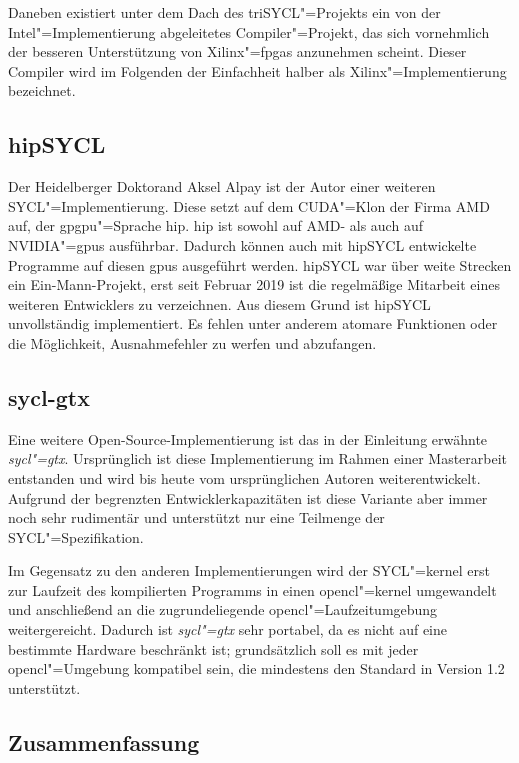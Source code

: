 Daneben existiert unter dem Dach des triSYCL"=Projekts ein von der
Intel"=Implementierung abgeleitetes Compiler"=Projekt, das sich vornehmlich der
besseren Unterstützung von Xilinx"=\gls{fpga}s anzunehmen scheint. Dieser
Compiler wird im Folgenden der Einfachheit halber als Xilinx"=Implementierung
bezeichnet. \cite[vgl.][]{trisyclclang}

\subsection{hipSYCL}

Der Heidelberger Doktorand Aksel Alpay ist der Autor einer weiteren
SYCL"=Implementierung. Diese setzt auf dem CUDA"=Klon der Firma AMD auf, der
\gls{gpgpu}"=Sprache \gls{hip}. \gls{hip} ist sowohl auf AMD- als auch auf
NVIDIA"=\gls{gpu}s ausführbar. Dadurch können auch mit hipSYCL entwickelte
Programme auf diesen \gls{gpu}s ausgeführt werden. hipSYCL war über weite
Strecken ein Ein-Mann-Projekt, erst seit Februar 2019 ist die regelmäßige
Mitarbeit eines weiteren Entwicklers zu verzeichnen. Aus diesem Grund ist
hipSYCL unvollständig implementiert. Es fehlen unter anderem atomare Funktionen
oder die Möglichkeit, Ausnahmefehler zu werfen und abzufangen.
\cite[vgl.][]{hipsycl}

\subsection{sycl-gtx}

Eine weitere Open-Source-Implementierung ist das in der Einleitung erwähnte
\textit{sycl"=gtx}. Ursprünglich ist diese Implementierung im Rahmen einer
Masterarbeit entstanden \cite[vgl.][]{zuzek2016} und wird bis heute vom
ursprünglichen Autoren weiterentwickelt. Aufgrund der begrenzten
Entwicklerkapazitäten ist diese Variante aber immer noch sehr rudimentär und
unterstützt nur eine Teilmenge der SYCL"=Spezifikation.

Im Gegensatz zu den anderen Implementierungen wird der SYCL"=\gls{kernel} erst
zur Laufzeit des kompilierten Programms in einen \gls{opencl}"=\gls{kernel}
umgewandelt und anschließend an die zugrundeliegende
\gls{opencl}"=Laufzeitumgebung weitergereicht. Dadurch ist \textit{sycl"=gtx}
sehr portabel, da es nicht auf eine bestimmte Hardware beschränkt ist;
grundsätzlich soll es mit jeder \gls{opencl}"=Umgebung kompatibel sein, die
mindestens den Standard in Version 1.2 unterstützt. 
\cite[vgl.][47\psqq]{zuzek2016}

\subsection{Zusammenfassung}

